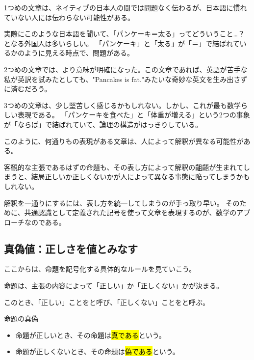 \documentclass[../../imaging-math]{subfiles}
\begin{document}
1つめの文章は、ネイティブの日本人の間では問題なく伝わるが、日本語に慣れていない人には伝わらない可能性がある。

実際にこのような日本語を聞いて、「パンケーキ＝太る」ってどういうこと…？となる外国人は多いらしい。
「パンケーキ」と「太る」が「＝」で結ばれているかのように見える時点で、問題がある。

\br

2つめの文章では、より意味が明確になった。この文章であれば、英語が苦手な私が英訳を試みたとしても、"Pancakes is fat."みたいな奇妙な英文を生み出さずに済むだろう。

\br

3つめの文章は、少し堅苦しく感じるかもしれない。しかし、これが最も数学らしい表現である。
「パンケーキを食べた」と「体重が増える」という2つの事象が「ならば」で結ばれていて、論理の構造がはっきりしている。

\froufrou

このように、何通りもの表現がある文章は、人によって解釈が異なる可能性がある。

客観的な主張であるはずの命題も、その表し方によって解釈の齟齬が生まれてしまうと、結局正しいか正しくないかが人によって異なる事態に陥ってしまうかもしれない。

\br

解釈を一通りにするには、表し方を統一してしまうのが手っ取り早い。
そのために、共通認識として定義された記号を使って文章を表現するのが、数学のアプローチなのである。

\subsection{真偽値：正しさを値とみなす}

ここからは、命題を記号化する具体的なルールを見ていこう。

\br

命題は、主張の内容によって「正しい」か「正しくない」かが決まる。

このとき、「正しい」ことをと呼び、「正しくない」ことをと呼ぶ。

\begin{definition}{命題の真偽}
  \begin{itemize}
    \item 命題が正しいとき、その命題は\hl{真である}という。
    \item 命題が正しくないとき、その命題は\hl{偽である}という。
  \end{itemize}
\end{definition}
\end{document}

